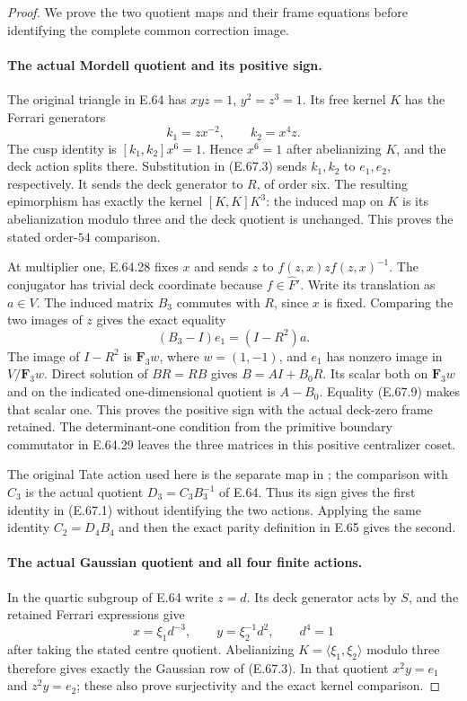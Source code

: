 \begin{proof}
We prove the two quotient maps and their frame equations before
identifying the complete common correction image.

\paragraph{The actual Mordell quotient and its positive sign.}
The original triangle in E.64 has $xyz=1$, $y^2=z^3=1$.
Its free kernel $K$ has the Ferrari generators
\[
                 k_1=zx^{-2},\qquad k_2=x^4z.
 \tag{E.67.8}
\]
The cusp identity is $[k_1,k_2]x^6=1$. Hence $x^6=1$
after abelianizing $K$, and the deck action splits there.
Substitution in \textup{(E.67.3)} sends $k_1,k_2$ to
$e_1,e_2$, respectively. It sends the deck generator to
$R$, of order six. The resulting epimorphism has exactly
the kernel $[K,K]K^3$: the induced map on $K$ is its
abelianization modulo three and the deck quotient is unchanged.
This proves the stated order-$54$ comparison.

At multiplier one, E.64.28 fixes $x$ and sends
$z$ to $f(z,x)zf(z,x)^{-1}$. The conjugator has trivial
deck coordinate because $f\in\widehat F'$. Write its
translation as $a\in V$. The induced matrix $B_3$ commutes
with $R$, since $x$ is fixed. Comparing the two images of
$z$ gives the exact equality
\[
                    (B_3-I)e_1=(I-R^2)a.
 \tag{E.67.9}
\]
The image of $I-R^2$ is $\mathbf F_3w$, where
$w=(1,-1)$, and $e_1$ has nonzero image in $V/\mathbf F_3w$.
Direct solution of $BR=RB$ gives $B=A I+B_0R$.
Its scalar both on $\mathbf F_3w$ and on the indicated
one-dimensional quotient is $A-B_0$. Equality
\textup{(E.67.9)} makes that scalar one. This proves the
positive sign with the actual deck-zero frame retained.
The determinant-one condition from the primitive boundary
commutator in E.64.29 leaves the three matrices in this
positive centralizer coset.

The original Tate action used here is the separate map in
\cite[Proposition 4.4]{DE_NakamuraTsunogaiYasuda2010};
the comparison with $C_3$ is the actual quotient
$D_3=C_3B_3^{-1}$ of E.64. Thus its sign gives the first
identity in \textup{(E.67.1)} without identifying the two
actions. Applying the same identity $C_2=D_4B_4$ and then
the exact parity definition in E.65 gives the second.

\paragraph{The actual Gaussian quotient and all four finite actions.}
In the quartic subgroup of E.64 write $z=d$.
Its deck generator acts by $S$, and the retained Ferrari
expressions give
\[
 x=\xi_1d^{-3},\qquad y=\xi_2^{-1}d^2,
             \qquad d^4=1
 \tag{E.67.10}
\]
after taking the stated centre quotient. Abelianizing
$K=\langle\xi_1,\xi_2\rangle$ modulo three therefore
gives exactly the Gaussian row of \textup{(E.67.3)}.
In that quotient $x^2y=e_1$ and $z^2y=e_2$; these also
prove surjectivity and the exact kernel comparison.


\end{proof}
